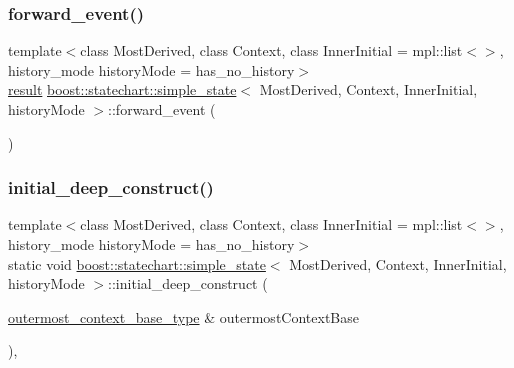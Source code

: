 \mbox{\label{classboost_1_1statechart_1_1simple__state_a9892a580bc7f9b502e5c01970bff17cf}} 
\subsubsection{\texorpdfstring{forward\+\_\+event()}{forward\_event()}}
{\footnotesize\ttfamily template$<$class Most\+Derived, class Context, class Inner\+Initial = mpl\+::list$<$$>$, history\+\_\+mode history\+Mode = has\+\_\+no\+\_\+history$>$ \\
\mbox{\hyperlink{namespaceboost_1_1statechart_abe807f6598b614d6d87bb951ecd92331}{result}} \mbox{\hyperlink{classboost_1_1statechart_1_1simple__state}{boost\+::statechart\+::simple\+\_\+state}}$<$ Most\+Derived, Context, Inner\+Initial, history\+Mode $>$\+::forward\+\_\+event (\begin{DoxyParamCaption}{ }\end{DoxyParamCaption})\hspace{0.3cm}{\ttfamily [inline]}}

\mbox{\label{classboost_1_1statechart_1_1simple__state_a082eb6f318470e080ca90502d32fde98}} 
\subsubsection{\texorpdfstring{initial\+\_\+deep\+\_\+construct()}{initial\_deep\_construct()}}
{\footnotesize\ttfamily template$<$class Most\+Derived, class Context, class Inner\+Initial = mpl\+::list$<$$>$, history\+\_\+mode history\+Mode = has\+\_\+no\+\_\+history$>$ \\
static void \mbox{\hyperlink{classboost_1_1statechart_1_1simple__state}{boost\+::statechart\+::simple\+\_\+state}}$<$ Most\+Derived, Context, Inner\+Initial, history\+Mode $>$\+::initial\+\_\+deep\+\_\+construct (\begin{DoxyParamCaption}\item[{\mbox{\hyperlink{classboost_1_1statechart_1_1simple__state_a50f21d7a7d6632eb34430e74cbad3197}{outermost\+\_\+context\+\_\+base\+\_\+type}} \&}]{outermost\+Context\+Base }\end{DoxyParamCaption})\hspace{0.3cm}{\ttfamily [inline]}, {\ttfamily [static]}}

